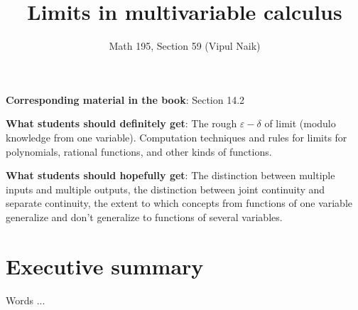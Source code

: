\documentclass[10pt]{amsart}
\title{Limits in multivariable calculus}
\author{Math 195, Section 59 (Vipul Naik)}
\begin{document}
\maketitle

{\bf Corresponding material in the book}: Section 14.2

{\bf What students should definitely get}: The rough $\varepsilon-\delta$
of limit (modulo knowledge from one variable). Computation techniques
and rules for limits for polynomials, rational functions, and other
kinds of functions.

{\bf What students should hopefully get}: The distinction between
multiple inputs and multiple outputs, the distinction between joint
continuity and separate continuity, the extent to which concepts from
functions of one variable generalize and don't generalize to functions
of several variables.

\section*{Executive summary}

Words ...
\end{document}
